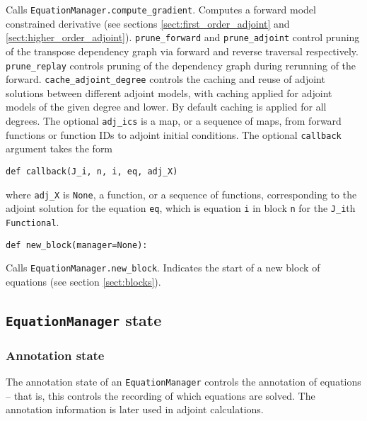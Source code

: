 \documentclass[11pt]{article}
\begin{document}
Calls \texttt{EquationManager.compute\_gradient}. Computes a forward model
constrained derivative (see sections \ref{sect:first_order_adjoint} and
\ref{sect:higher_order_adjoint}). \texttt{prune\_forward} and
\texttt{prune\_adjoint} control pruning of the transpose dependency graph via
forward and reverse traversal respectively. \texttt{prune\_replay} controls
pruning of the dependency graph during rerunning of the forward.
\texttt{cache\_adjoint\_degree} controls the caching and reuse of adjoint
solutions between different adjoint models, with caching applied for adjoint
models of the given degree and lower. By default caching is applied for all
degrees. The optional \texttt{adj\_ics} is a map, or a sequence of maps, from
forward functions or function IDs to adjoint initial conditions. The optional
\texttt{callback} argument takes the form
\begin{lstlisting}
def callback(J_i, n, i, eq, adj_X)
\end{lstlisting}
where \texttt{adj\_X} is \texttt{None}, a function, or a sequence of functions,
corresponding to the adjoint solution for the equation \texttt{eq}, which is
equation \texttt{i} in block \texttt{n} for the \texttt{J\_i}th
\texttt{Functional}.
\begin{lstlisting}
def new_block(manager=None):
\end{lstlisting}
Calls \texttt{EquationManager.new\_block}. Indicates the start of a new block
of equations (see section \ref{sect:blocks}).

\subsection{\texttt{EquationManager} state}\label{sect:EquationManager_state}

\subsubsection{Annotation state}

The annotation state of an \texttt{EquationManager} controls the annotation of
equations -- that is, this controls the recording of which equations are
solved. The annotation information is later used in adjoint calculations.
\end{document}
